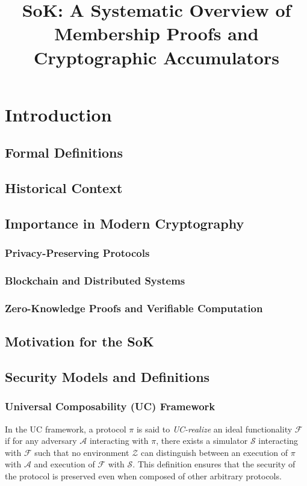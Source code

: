 \documentclass{iacrcc}
\title[running  = {SoK: Commitments and Membership Proofs},
       subtitle = {}
      ]{SoK: A Systematic Overview of Membership Proofs and Cryptographic Accumulators}
\begin{document}
\maketitle

\tableofcontents

\section{Introduction}

\cite{STOC:GolMicRac85}

\subsection{Formal Definitions}
\subsection{Historical Context}
\subsection{Importance in Modern Cryptography}
\subsubsection{Privacy-Preserving Protocols}
\subsubsection{Blockchain and Distributed Systems}
\subsubsection{Zero-Knowledge Proofs and Verifiable Computation}
\subsection{Motivation for the SoK}

\subsection{Security Models and Definitions}

\subsubsection{Universal Composability (UC) Framework}

\cite{FOCS:Canetti01}

\begin{definition}
In the UC framework, a protocol $\pi$ is said to \textit{UC-realize} an ideal functionality $\mathcal{F}$ if for any adversary $\mathcal{A}$ interacting with $\pi$, there exists a simulator $\mathcal{S}$ interacting with $\mathcal{F}$ such that no environment $\mathcal{Z}$ can distinguish between an execution of $\pi$ with $\mathcal{A}$ and execution of $\mathcal{F}$ with $\mathcal{S}$. This definition ensures that the security of the protocol is preserved even when composed of other arbitrary protocols.
\end{definition}
\end{document}
